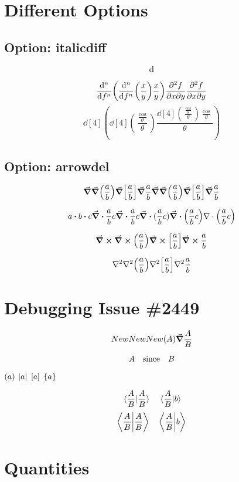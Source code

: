 \documentclass{article}
\begin{document}
\section*{Different Options}


\subsection*{Option: italicdiff}
\[
\diffd
\]

\[
  \dv[n]{f}(\dv[n]{f}(\frac{x}{y})\frac{x}{y})
  \pdv[n]{f}{x}{y}(\pdv[n]{f}{x}{y}(\frac{x}{y})\frac{x}{y})
  \pdv{f}{x}{y}(\pdv{f}{x}{y}(\frac{x}{y})\frac{x}{y})
\]
\[
  \dd[4](\dd[4](\frac{\frac{\cos}{\theta}}{\theta})\frac{\dd[4](\frac{\frac{\cos}{\theta}}{\theta})\frac{\cos}{\theta}}{\theta})
\]

\subsection*{Option: arrowdel}


\[
  \gradient 
  \gradient(\frac{a}{b})
  \gradient[\frac{a}{b}]
  \gradient{\frac{a}{b}}
  \grad 
  \grad(\frac{a}{b})
  \grad[\frac{a}{b}]
  \grad{\frac{a}{b}}
\]

\[
  a\dotproduct b \vdot c
  \divergence{\frac{a}{b}c}
  \div{\frac{a}{b}c}
  \div{(\frac{a}{b}c)}
  \div(\frac{a}{b}c)
  {\bf\nabla} \cdot \left(\frac{a}{b}c\right)
\]

\[
  \curl 
  \curl(\frac{a}{b})
  \curl[\frac{a}{b}]
  \curl{\frac{a}{b}}
\]

\[
  \laplacian 
  \laplacian(\frac{a}{b})
  \laplacian[\frac{a}{b}]
  \laplacian{\frac{a}{b}}
\]




\newpage

\section*{Debugging Issue \#2449}

\[\Residue \Res \Res(A) \grad{\frac{A}{B}}\]


\[A \qsince B\]

\(\pqty {a}\)  \(\vqty {a}\)  \(\bqty {a}\)  \(\Bqty {a}\)

  
  \[
\ip*{\frac {A}{B}} \quad \ip*{\frac {A}{B}}{b}
\]
\[
\ip{\frac{A}{B}} \quad \ip{\frac{A}{B}}{b}
\]
  
\newpage
\section*{Quantities}
\end{document}
